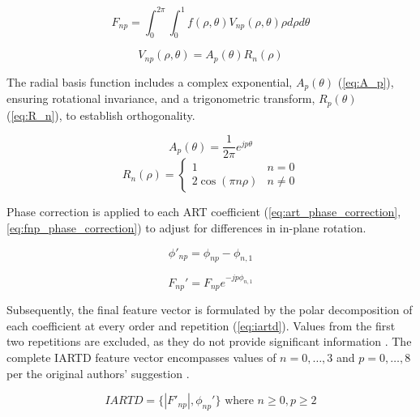 \begin{equation}
	\label{eq:F_np}
	F_{np} = \int_{0}^{2\pi}\int_{0}^{1}f(\rho,\theta)V_{np}(\rho,\theta)\rho d\rho d\theta
\end{equation}

\begin{equation}
	\label{eq:V_np}
	V_{np}(\rho,\theta) = A_{p}(\theta)R_{n}(\rho)
\end{equation}

The radial basis function includes a complex exponential, $A_{p}(\theta)$ (\cref{eq:A_p}), ensuring rotational invariance, and a trigonometric transform, $R_{p}(\theta)$ (\cref{eq:R_n}), to establish orthogonality.

\begin{equation}
	\label{eq:A_p}
	A_{p}(\theta) = \dfrac{1}{2\pi}e^{jp\theta}
\end{equation}
\begin{equation}
	\label{eq:R_n}
	R_{n}(\rho) =
	\begin{cases}
		1                   & n=0     \\
		2 \cos (\pi n \rho) & n \ne 0
	\end{cases}
\end{equation}

Phase correction is applied to each ART coefficient (\cref{eq:art_phase_correction}, \cref{eq:fnp_phase_correction}) to adjust for differences in in-plane rotation.

\begin{equation}
	\label{eq:art_phase_correction}
	\phi'_{np} = \phi_{np} - \phi_{n,1}
\end{equation}

\begin{equation}
	\label{eq:fnp_phase_correction}
	F_{np}' = F_{np}e^{-jp\phi_{n,1}}
\end{equation}

Subsequently, the final feature vector is formulated by the polar decomposition of each coefficient at every order and repetition (\cref{eq:iartd}).
Values from the first two repetitions are excluded, as they do not provide significant information \cite{leeNewShapeDescription2012}.
The complete IARTD feature vector encompasses values of $n={0, \dots, 3 }$ and $p={0, \dots, 8}$ per the original authors' suggestion \cite{leeNewShapeDescription2012}.

\begin{equation}
	\label{eq:iartd}
	IARTD = \{|F'_{np}|, \phi_{np}'\} \text{ where } n \ge 0, p \ge 2
\end{equation}

